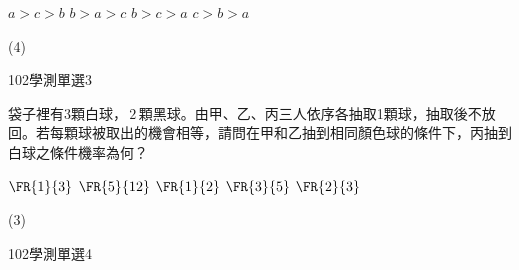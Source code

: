 \begin{QUESTIONS}
\begin{QUESTION}
\begin{QBODY}
\begin{QOPS}
				\QOP $a>c>b$
				\QOP $b>a>c$
				\QOP $b>c>a$
				\QOP $c>b>a$
			\end{QOPS}
        \end{QBODY}
        \begin{QFROMS}
        \end{QFROMS}
        \begin{QTAGS}\end{QTAGS}
        \begin{QANS}
            (4)
        \end{QANS}
        \begin{QSOLLIST}
        \end{QSOLLIST}
        \begin{QEMPTYSPACE}
        \end{QEMPTYSPACE}
    \end{QUESTION}
    \begin{QUESTION}
        \begin{ExamInfo}{102}{學測}{單選}{3}
        \end{ExamInfo}
        \begin{ExamAnsRateInfo}{35}{67}{26}{12}
        \end{ExamAnsRateInfo}
        \begin{QBODY}
			袋子裡有3顆白球，$\,2\,$顆黑球。由甲、乙、丙三人依序各抽取1顆球，抽取後不放回。若每顆球被取出的機會相等，請問在甲和乙抽到相同顏色球的條件下，丙抽到白球之條件機率為何？
			\begin{QOPS}
				\QOP $\FR{1}{3}$	
				\QOP $\FR{5}{12}$	
				\QOP $\FR{1}{2}$
				\QOP $\FR{3}{5}$	
				\QOP $\FR{2}{3}$
			\end{QOPS}
        \end{QBODY}
        \begin{QFROMS}
        \end{QFROMS}
        \begin{QTAGS}\end{QTAGS}
        \begin{QANS}
            (3)
        \end{QANS}
        \begin{QSOLLIST}
        \end{QSOLLIST}
        \begin{QEMPTYSPACE}
        \end{QEMPTYSPACE}
    \end{QUESTION}
    \begin{QUESTION}
        \begin{ExamInfo}{102}{學測}{單選}{4}

\end{ExamInfo}
\end{QUESTION}
\end{QUESTIONS}
